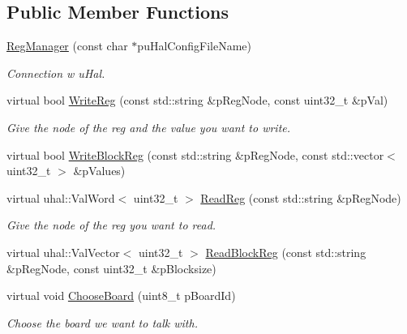 \subsection*{Public Member Functions}
\begin{DoxyCompactItemize}
\item 
\hyperlink{class_ph2___hw_interface_1_1_reg_manager_a938f6b582b1fffcb478f35fd9d81954f}{Reg\-Manager} (const char $\ast$pu\-Hal\-Config\-File\-Name)
\begin{DoxyCompactList}\small\item\em Connection w u\-Hal. \end{DoxyCompactList}\item 
virtual bool \hyperlink{class_ph2___hw_interface_1_1_reg_manager_a31174516fef6706c88c3f59dd93e4fdf}{Write\-Reg} (const std\-::string \&p\-Reg\-Node, const uint32\-\_\-t \&p\-Val)
\begin{DoxyCompactList}\small\item\em Give the node of the reg and the value you want to write. \end{DoxyCompactList}\item 
virtual bool \hyperlink{class_ph2___hw_interface_1_1_reg_manager_a888f5cccb05daa28896cf622abfdcbd6}{Write\-Block\-Reg} (const std\-::string \&p\-Reg\-Node, const std\-::vector$<$ uint32\-\_\-t $>$ \&p\-Values)
\item 
\hypertarget{class_ph2___hw_interface_1_1_reg_manager_a077e0a18592206365150680213345112}{virtual uhal\-::\-Val\-Word$<$ uint32\-\_\-t $>$ \hyperlink{class_ph2___hw_interface_1_1_reg_manager_a077e0a18592206365150680213345112}{Read\-Reg} (const std\-::string \&p\-Reg\-Node)}\label{class_ph2___hw_interface_1_1_reg_manager_a077e0a18592206365150680213345112}

\begin{DoxyCompactList}\small\item\em Give the node of the reg you want to read. \end{DoxyCompactList}\item 
virtual uhal\-::\-Val\-Vector$<$ uint32\-\_\-t $>$ \hyperlink{class_ph2___hw_interface_1_1_reg_manager_a6481c211d27badc409ff0e7af20575e4}{Read\-Block\-Reg} (const std\-::string \&p\-Reg\-Node, const uint32\-\_\-t \&p\-Blocksize)
\item 
\hypertarget{class_ph2___hw_interface_1_1_reg_manager_a20c502bcad5115c6ae16d4d356b72f0c}{virtual void \hyperlink{class_ph2___hw_interface_1_1_reg_manager_a20c502bcad5115c6ae16d4d356b72f0c}{Choose\-Board} (uint8\-\_\-t p\-Board\-Id)}\label{class_ph2___hw_interface_1_1_reg_manager_a20c502bcad5115c6ae16d4d356b72f0c}

\begin{DoxyCompactList}\small\item\em Choose the board we want to talk with. \end{DoxyCompactList}\end{DoxyCompactItemize}
